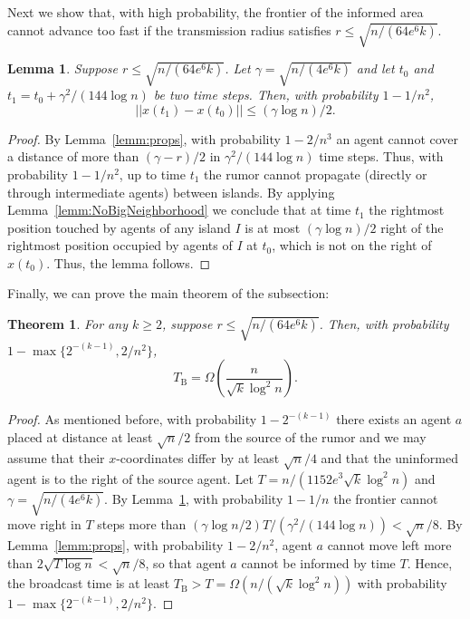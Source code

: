 \documentclass[11pt]{article}
\newcommand{\bigOm}[1]{\Omega\left(#1\right)}
\newcommand{\dist}[1]{||#1||}
\newcommand{\bt}{T_{\mathrm{B}}}
\newcommand{\point}[1]{#1} \newcommand{\pos}[2]{x_{#1}(#2)} \newcommand{\mes}[2]{M_{#1}(#2)} \newcommand{\meet}[2]{\textrm{Meet}_{#1}(#2)}
\newtheorem{theo}{Theorem}
\newtheorem{lemm}{Lemma}
\begin{document}
Next we show that, with high probability,
the frontier of the informed area cannot advance too fast
if the transmission radius satisfies $r \leq \sqrt{n / (64 e^6 k)}$.
\begin{lemm}
\label{lemm:SlowFrontier}
Suppose $r \leq \sqrt{n / (64 e^6 k)}$.
Let $\gamma =  \sqrt{n / (4 e^6 k)}$ and let $t_0$
and $t_1 = t_0 + \gamma^2/(144 \log n)$ be two time steps.
Then, with probability $1 - 1/n^2$,
\[
	\dist{\point{x}(t_1) - \point{x}(t_0)} \leq (\gamma \log n) / 2.
\]
\end{lemm}
\begin{proof}
By Lemma~\ref{lemm:props}, with probability $1-2/n^3$ an agent cannot
cover a distance of more than $(\gamma - r) / 2$ in $\gamma^2/(144 \log n)$
time steps.  Thus, with probability $1-1/n^2$, up to time $t_1$ the
rumor cannot propagate (directly or through intermediate agents)
between islands. By applying Lemma~\ref{lemm:NoBigNeighborhood} we
conclude that at time $t_1$ the rightmost position touched by agents
of any island $I$ is at most $(\gamma \log n) / 2$ right of the
rightmost position occupied by agents of $I$ at $t_0$, which is not on
the right of $x(t_0)$. Thus, the lemma follows.
\end{proof}

Finally, we can prove the main theorem of the subsection:
\begin{theo}
\label{theo:LBSpreadingTime2}
For any $k \geq 2$, suppose $r \leq \sqrt{n / (64 e^6 k)}$.
Then, with probability \sloppy $1 - \max\{2^{-(k-1)}, 2/n^2\}$,
\[
	\bt = \bigOm{\frac{n}{\sqrt{k}\log^2 n}}.
\]
\end{theo}
\begin{proof}
As mentioned before, with probability $1 - 2^{-(k-1)}$
there exists an agent $a$ placed at
distance at least $\sqrt{n}/2$ from the source of the rumor and we may
assume that their $x$-coordinates differ by at least $\sqrt{n}/4$ and
that the uninformed agent is to the right of the source agent.
Let $T = n / (1152 e^3 \sqrt{k} \log^2 n)$ and
$\gamma = \sqrt{n / (4 e^6 k)}$.
By Lemma~\ref{lemm:SlowFrontier}, with probability $1 - 1/n$
the frontier cannot move right in $T$ steps more than
$(\gamma \log n / 2) T / (\gamma^2 / (144 \log n)) < \sqrt{n} / 8$.
By Lemma~\ref{lemm:props}, with probability $1 - 2/n^2$,
agent $a$ cannot move left more than $2 \sqrt{T\log n} < \sqrt{n}/8$,
so that agent $a$ cannot be informed by time $T$.
Hence, the broadcast time is at least
$\bt > T = \bigOm{n/(\sqrt{k}\log^2 n)}$
with probability $1 - \max\{2^{-(k-1)}, 2/n^2\}$.
\end{proof}
\end{document}
